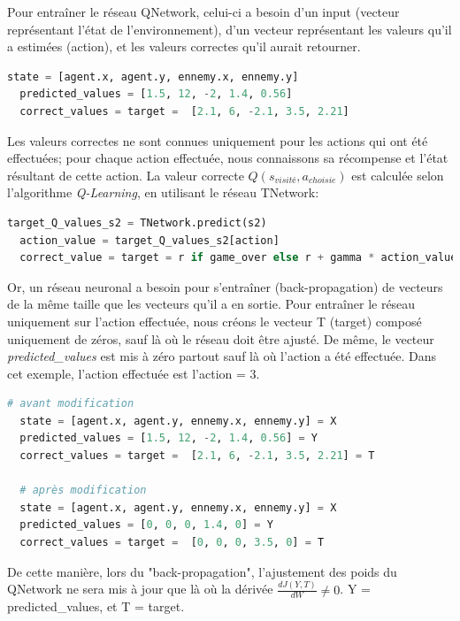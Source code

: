 \documentclass[11pt,a4paper]{report}
\begin{document}
  \par Pour entraîner le réseau QNetwork, celui-ci a besoin d'un input (vecteur représentant l'état de l'environnement), d'un vecteur représentant les valeurs qu'il a estimées (action), et les valeurs correctes qu'il aurait retourner. 
  
  \begin{lstlisting}[language=python]
  state = [agent.x, agent.y, ennemy.x, ennemy.y]
  predicted_values = [1.5, 12, -2, 1.4, 0.56]
  correct_values = target =  [2.1, 6, -2.1, 3.5, 2.21]
  \end{lstlisting} 
  
  \par Les valeurs correctes ne sont connues uniquement pour les actions qui ont été effectuées; pour chaque action effectuée, nous connaissons sa récompense et l'état résultant de cette action. La valeur correcte $Q(s_{visité}, a_{choisie})$ est calculée selon l'algorithme \textit{Q-Learning}, en utilisant le réseau TNetwork:
  
  \begin{lstlisting}[language=python]
  target_Q_values_s2 = TNetwork.predict(s2)
  action_value = target_Q_values_s2[action]
  correct_value = target = r if game_over else r + gamma * action_value
  \end{lstlisting}   
  
  \par Or, un réseau neuronal a besoin pour s’entraîner (back-propagation) de vecteurs de la même taille que les vecteurs qu'il a en sortie. Pour entraîner le réseau uniquement sur l'action effectuée, nous créons le vecteur T (target) composé uniquement de zéros, sauf là où le réseau doit être ajusté. De même, le vecteur \textit{predicted\_values} est mis à zéro partout sauf là où l'action a été effectuée. Dans cet exemple, l'action effectuée est l'action = 3. 
  
  \begin{lstlisting}[language=python]
  # avant modification
  state = [agent.x, agent.y, ennemy.x, ennemy.y] = X
  predicted_values = [1.5, 12, -2, 1.4, 0.56] = Y
  correct_values = target =  [2.1, 6, -2.1, 3.5, 2.21] = T
  
  # après modification
  state = [agent.x, agent.y, ennemy.x, ennemy.y] = X
  predicted_values = [0, 0, 0, 1.4, 0] = Y
  correct_values = target =  [0, 0, 0, 3.5, 0] = T
  \end{lstlisting} 
  
  \par De cette manière, lors du "back-propagation", l'ajustement des poids du QNetwork ne sera mis à jour que là où la dérivée $\frac{dJ(Y,T)}{dW} \neq 0$. Y = predicted\_values, et T = target.
  
\end{document}
